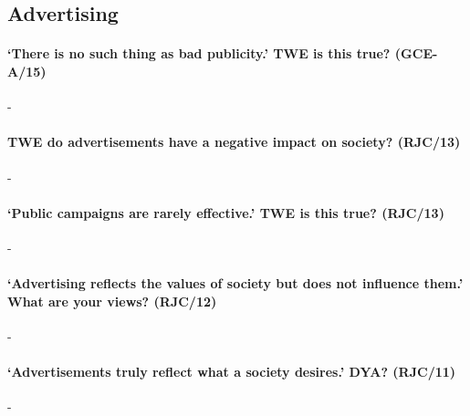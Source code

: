 \documentclass[../../main]{subfiles}
\begin{document}
\subsection{Advertising}

\paragraph{`There is no such thing as bad publicity.' TWE is this true? (GCE-A/15)}-

\paragraph{TWE do advertisements have a negative impact on society? (RJC/13)}-

\paragraph{`Public campaigns are rarely effective.' TWE is this true? (RJC/13)}-

\paragraph{`Advertising reflects the values of society but does not influence them.' What are your views? (RJC/12)}-

\paragraph{`Advertisements truly reflect what a society desires.' DYA? (RJC/11)}-
\end{document}
